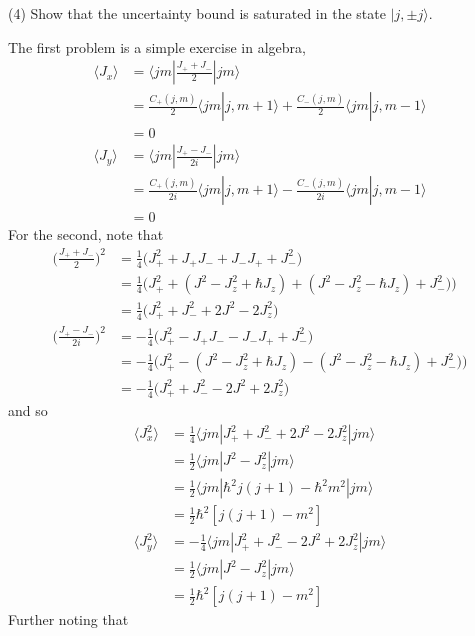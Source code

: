\documentclass[../principles-of-quantum-mechanics.tex]{subfiles}
\begin{document}
\begin{questions}
		(4) Show that the uncertainty bound is saturated in the state $|j, \pm j\rangle$.
		\begin{solution}
			The first problem is a simple exercise in algebra,
			\begin{align*}
				\langle J_x\rangle &= \langle jm|\frac{J_+ + J_-}{2}|jm\rangle \\
				&= \frac{C_+(j, m)}{2}\langle jm|j, m+1\rangle + \frac{C_-(j, m)}{2}\langle jm|j, m - 1\rangle \\
				&= 0 \\
				\langle J_y\rangle &= \langle jm|\frac{J_+ - J_-}{2i}|jm\rangle \\
				&= \frac{C_+(j, m)}{2i}\langle jm|j, m+1\rangle - \frac{C_-(j, m)}{2i}\langle jm|j, m-1\rangle \\
				&= 0
			\end{align*}
			For the second, note that
			\begin{align*}
				\Big(\frac{J_+ + J_-}{2}\Big)^2 &= \frac{1}{4}\Big(J_+^2 + J_+J_- + J_-J_+ + J_-^2\Big) \\
				&= \frac{1}{4}\Big(J_+^2 + (J^2 - J_z^2 + \hbar J_z) + (J^2 - J_z^2 - \hbar J_z) + J_-^2)\Big) \\
				&= \frac{1}{4}\Big(J_+^2 + J_-^2 + 2J^2 - 2J_z^2\Big) \\
				\Big(\frac{J_+ - J_-}{2i}\Big)^2 &= -\frac{1}{4}\Big(J_+^2 - J_+J_- - J_-J_+ + J_-^2\Big) \\
				&= -\frac{1}{4}\Big(J_+^2 - (J^2 - J_z^2 + \hbar J_z) - (J^2 - J_z^2 - \hbar J_z) + J_-^2)\Big) \\
				&= -\frac{1}{4}\Big(J_+^2 + J_-^2 - 2J^2 + 2J_z^2\Big)
			\end{align*}
			and so
			\begin{align*}
				\langle J_x^2\rangle &= \frac{1}{4}\langle jm|J_+^2 + J_-^2 + 2J^2 - 2J_z^2|jm\rangle \\
				&= \frac{1}{2}\langle jm|J^2 - J_z^2|jm\rangle \\
				&= \frac{1}{2}\langle jm|\hbar^2 j(j+1) - \hbar^2m^2|jm\rangle \\
				&= \frac{1}{2}\hbar^2[j(j + 1) - m^2] \\
				\langle J_y^2\rangle &= -\frac{1}{4}\langle jm|J_+^2 + J_-^2 - 2J^2 + 2J_z^2|jm\rangle \\
				&= \frac{1}{2}\langle jm|J^2 - J_z^2|jm\rangle \\
				&= \frac{1}{2}\hbar^2[j(j + 1) - m^2]
			\end{align*}
			Further noting that
			\begin{align*}

\end{align*}
\end{solution}
\end{questions}
\end{document}
